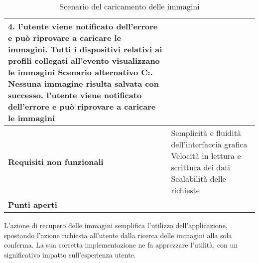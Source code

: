 \begin{table}[htb]
\begin{tabular} {|P{4.5cm}|P{11cm}|}
        4. l'utente viene notificato dell'errore e può riprovare a caricare le immagini. Tutti i dispositivi relativi ai profili collegati all'evento visualizzano le immagini\newline
        Scenario alternativo C:. Nessuna immagine risulta salvata con successo. l'utente viene notificato dell'errore e può riprovare a caricare le immagini                                     \\
        \hline
        \textbf{Requisiti non funzionali} & Semplicità e fluidità dell'interfaccia grafica   \linebreak
        Velocità in lettura e scrittura dei dati\linebreak
        Scalabilità delle richieste                                                                                         \\
        \hline
        \textbf{Punti aperti}             &                                                                                 \\
        \hline
    \end{tabular}

    \caption{Scenario del caricamento delle immagini}
\end{table}
\clearpage

L'azione di recupero delle immagini semplifica l'utilizzo dell'applicazione, spostando l'azione richiesta all'utente dalla ricerca delle immagini alla sola conferma.
La sua corretta implementazione ne fa apprezzare l'utilità, con un significativo impatto sull'esperienza utente.\\

